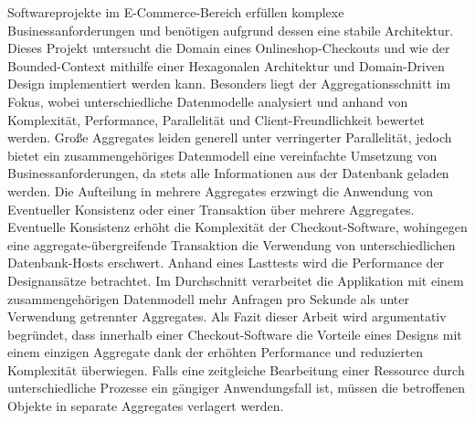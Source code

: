 {{{			Softwareprojekte im E-Commerce-Bereich erfüllen komplexe Businessanforderungen und benötigen aufgrund dessen eine stabile Architektur. Dieses Projekt untersucht die Domain eines Onlineshop-Checkouts und wie der Bounded-Context mithilfe einer Hexagonalen Architektur und Domain-Driven Design implementiert werden kann. Besonders liegt der Aggregationsschnitt im Fokus, wobei unterschiedliche Datenmodelle analysiert und anhand von Komplexität, Performance, Parallelität und Client-Freundlichkeit bewertet werden. Große Aggregates leiden generell unter verringerter Parallelität, jedoch bietet ein zusammengehöriges Datenmodell eine vereinfachte Umsetzung von Businessanforderungen, da stets alle Informationen aus der Datenbank geladen werden. Die Aufteilung in mehrere Aggregates erzwingt die Anwendung von Eventueller Konsistenz oder einer Transaktion über mehrere Aggregates. Eventuelle Konsistenz erhöht die Komplexität der Checkout-Software, wohingegen eine aggregate-übergreifende Transaktion die Verwendung von unterschiedlichen Datenbank-Hosts erschwert. Anhand eines Lasttests wird die Performance der Designansätze betrachtet. Im Durchschnitt verarbeitet die Applikation mit einem zusammengehörigen Datenmodell mehr Anfragen pro Sekunde als unter Verwendung getrennter Aggregates. Als Fazit dieser Arbeit wird argumentativ begründet, dass innerhalb einer Checkout-Software die Vorteile eines Designs mit einem einzigen Aggregate dank der erhöhten Performance und reduzierten Komplexität überwiegen. Falls eine zeitgleiche Bearbeitung einer Ressource durch unterschiedliche Prozesse ein gängiger Anwendungsfall ist, müssen die betroffenen Objekte in separate Aggregates verlagert werden.
			
			\par}
		\vfill
	}
	
	
	
	\pagebreak

	\large
	
	{
		\thispagestyle{plain}
		\vspace*{\fill}
		\vfill
	}
	
		
	\pagebreak
	
\par}